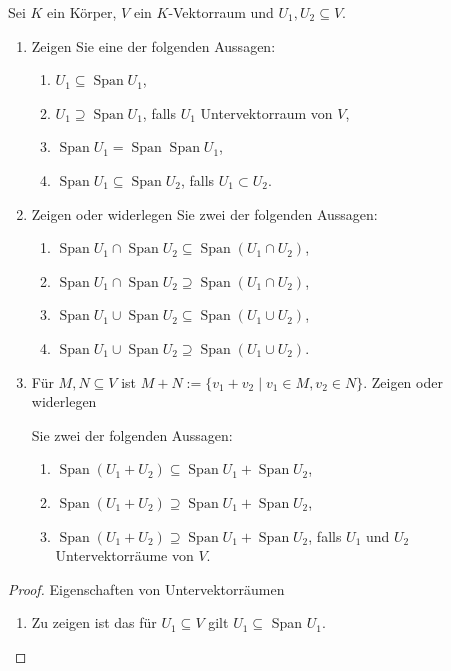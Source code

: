 \documentclass{../problemset}
\begin{document}
\begin{problem}
Sei $K$ ein Körper, $V$ ein $K$-Vektorraum und $U_1, U_2 \subseteq V$.
\begin{enumerate}
	\item Zeigen Sie eine der folgenden Aussagen:
	      \begin{enumerate}[label=\alph*)]
		      \item $U_1 \subseteq \operatorname{Span} U_1$,
		      \item $U_1 \supseteq \operatorname{Span} U_1$, falls $U_1$ Untervektorraum von $V$,
		      \item $\operatorname{Span} U_1 = \operatorname{Span} \operatorname{Span} U_1$,
		      \item $\operatorname{Span} U_1 \subseteq \operatorname{Span} U_2$, falls $U_1 \subset U_2$.
	      \end{enumerate}
	\item Zeigen oder widerlegen Sie zwei der folgenden Aussagen:
	      \begin{enumerate}[label=\alph*)]
		      \item $\operatorname{Span} U_1 \cap \operatorname{Span} U_2 \subseteq \operatorname{Span}(U_1 \cap U_2)$,
		      \item $\operatorname{Span} U_1 \cap \operatorname{Span} U_2 \supseteq \operatorname{Span}(U_1 \cap U_2)$,
		      \item $\operatorname{Span} U_1 \cup \operatorname{Span} U_2 \subseteq \operatorname{Span}(U_1 \cup U_2)$,
		      \item $\operatorname{Span} U_1 \cup \operatorname{Span} U_2 \supseteq \operatorname{Span}(U_1 \cup U_2)$.
	      \end{enumerate}
	\item Für $M, N \subseteq V$ ist $M + N := \{v_1 + v_2 \mid v_1 \in M, v_2 \in N\}$. Zeigen oder widerlegen

	      Sie zwei der folgenden Aussagen:
	      \begin{enumerate}[label=\alph*)]
		      \item $\operatorname{Span}(U_1 + U_2) \subseteq \operatorname{Span} U_1 + \operatorname{Span} U_2$,
		      \item $\operatorname{Span}(U_1 + U_2) \supseteq \operatorname{Span} U_1 + \operatorname{Span} U_2$,
		      \item $\operatorname{Span}(U_1 + U_2) \supseteq \operatorname{Span} U_1 + \operatorname{Span} U_2$, falls $U_1$ und $U_2$ Untervektorräume von $V$.
	      \end{enumerate}
\end{enumerate}
\begin{proof}
	Eigenschaften von Untervektorräumen
	\begin{enumerate}
		\item Zu zeigen ist das für $U_1 \subseteq V$ gilt $U_1 \subseteq$ Span $U_1$.


\end{enumerate}
\end{proof}
\end{problem}
\end{document}
